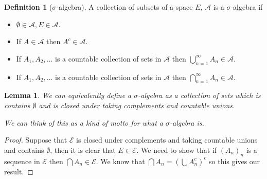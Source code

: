 \documentclass[
]{book}
\providecommand{\tightlist}{%
  \setlength{\itemsep}{0pt}\setlength{\parskip}{0pt}}
\newtheorem{lemma}{Lemma}[chapter]
\theoremstyle{definition}
\newtheorem{definition}{Definition}[chapter]
\theoremstyle{definition}
\theoremstyle{definition}
\theoremstyle{definition}
\theoremstyle{remark}
\begin{document}
\begin{definition}[$\sigma$-algebra]

A collection of subsets of a space \(E\), \(\mathcal{A}\) is a \(\sigma\)-algebra if

\begin{itemize}
\tightlist
\item
  \(\emptyset \in \mathcal{A}, E \in \mathcal{A}\).
\item
  If \(A \in \mathcal{A}\) then \(A^c \in \mathcal{A}\).
\item
  If \(A_1, A_2, \dots\) is a countable collection of sets in \(\mathcal{A}\) then \(\bigcup_{n=1}^\infty A_n \in \mathcal{A}\).
\item
  If \(A_1, A_2, \dots\) is a countable collection of sets in \(\mathcal{A}\) then \(\bigcap_{n=1}^\infty A_n \in \mathcal{A}\).
\end{itemize}

\end{definition}

\begin{lemma}
We can equivalently define a \(\sigma\)-algebra as a collection of sets which is contains \(\emptyset\) and is closed under taking complements and countable unions.

We can think of this as a kind of \emph{motto} for what a \(\sigma\)-algebra is.
\end{lemma}

\begin{proof}
Suppose that \(\mathcal{E}\) is closed under complements and taking countable unions and contains \(\emptyset\), then it is clear that \(E \in \mathcal{E}\). We need to show that if \((A_n)_n\) is a sequence in \(\mathcal{E}\) then \(\bigcap A_n \in \mathcal{E}\). We know that \(\bigcap A_n = \left( \bigcup A_n^c \right)^c\) so this gives our result.
\end{proof}
\end{document}
